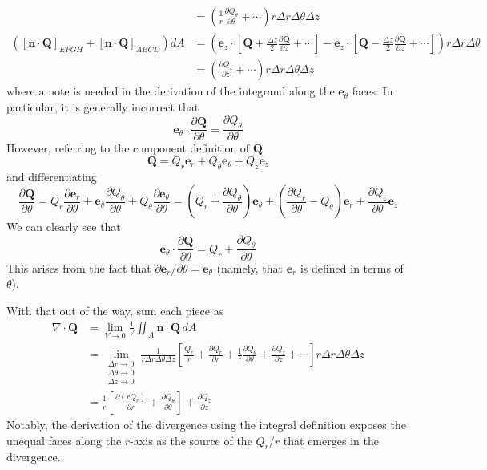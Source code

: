 \documentclass[a4paper]{article}
\begin{document}
\begin{align*}
												       & = \!\left( \frac{1}{r}\frac{\partial Q_{\theta}}{\partial \theta} + \cdots \right) r \Delta r \Delta \theta \Delta z \\
	\!\left( \!\left[ \pmb{n} \cdot \pmb{Q} \right]_{EFGH} + \!\left[ \pmb{n} \cdot \pmb{Q} \right]_{ABCD} \right)dA & = \!\left( \pmb{e}_{z} \cdot \!\left[ \pmb{Q} + \frac{\Delta z}{2}\frac{\partial \pmb{Q}}{\partial z} + \cdots \right] - \pmb{e}_{z} \cdot \!\left[ \pmb{Q} - \frac{\Delta z}{2}\frac{\partial \pmb{Q}}{\partial z} + \cdots \right] \right) r \Delta r \Delta \theta \\
												       & = \!\left( \frac{\partial Q_{z}}{\partial z} + \cdots \right)r \Delta r \Delta \theta \Delta z
\end{align*}
where a note is needed in the derivation of the integrand along the \( \pmb{e}_{\theta} \) faces. In particular, it is generally incorrect that
\[
	\pmb{e}_{\theta} \cdot \frac{\partial \pmb{Q}}{\partial \theta} = \frac{\partial Q_{\theta}}{\partial \theta}
\]
However, referring to the component definition of \( \pmb{Q} \)
\[
	\pmb{Q} = Q_{r}\pmb{e}_{r} + Q_{\theta}\pmb{e}_{\theta} + Q_{z}\pmb{e}_{z} 
\]
and differentiating 
\[
	\frac{\partial \pmb{Q}}{\partial \theta} = Q_{r}\frac{\partial \pmb{e}_{r}}{\partial \theta} + \pmb{e}_{\theta}\frac{\partial Q_{\theta}}{\partial \theta} + Q_{\theta}\frac{\partial \pmb{e}_{\theta}}{\partial \theta} = \!\left( Q_{r} + \frac{\partial Q_{\theta}}{\partial \theta} \right)\pmb{e}_{\theta} + \!\left( \frac{\partial Q_{r}}{\partial \theta} - Q_{\theta} \right)\pmb{e}_{r} + \frac{\partial Q_{z}}{\partial \theta}\pmb{e}_{z}
\]
We can clearly see that
\[
	\pmb{e}_{\theta} \cdot \frac{\partial \pmb{Q}}{\partial \theta} = Q_{r} + \frac{\partial Q_{\theta}}{\partial \theta} 
\]
This arises from the fact that \( \partial \pmb{e}_{r} / \partial \theta = \pmb{e}_{\theta} \) (namely, that \( \pmb{e}_{r} \) is defined in terms of \( \theta \)).

With that out of the way, sum each piece as 
\begin{align*}
	\nabla \cdot \pmb{Q} & = \lim\limits_{V \to 0}\frac{1}{V}\iint_{A} \pmb{n} \cdot \pmb{Q} \, dA \\
			     & = \lim\limits_{\substack{\Delta r \to 0 \\ \Delta \theta \to 0 \\ \Delta z \to 0}} \frac{1}{r \Delta r \Delta \theta \Delta z}\!\left[ \frac{Q_{r}}{r} + \frac{\partial Q_{r}}{\partial r} + \frac{1}{r}\frac{\partial Q_{\theta}}{\partial \theta} + \frac{\partial Q_{z}}{\partial z} + \cdots \right] r \Delta r \Delta \theta \Delta z \\ 
			     & = \frac{1}{r}\!\left[ \frac{\partial \!\left( rQ_{r} \right)}{\partial r} + \frac{\partial Q_{\theta}}{\partial \theta} \right] + \frac{\partial Q_{z}}{\partial z}
\end{align*}
Notably, the derivation of the divergence using the integral definition exposes the unequal faces along the \( r \)-axis as the source of the \( Q_{r} / r \) that emerges in the divergence.
\end{document}
